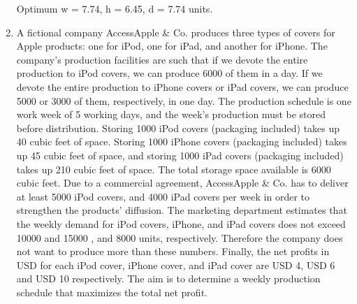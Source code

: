 \documentclass[journal,12pt,twocolumn]{IEEEtran}
\begin{document}
\begin{enumerate}
Optimum w = 7.74, h = 6.45, d = 7.74 units. 
\item A fictional company AccessApple  \&  Co. produces three types of covers for Apple products:
one for iPod, one for iPad, and another for iPhone. The company's production facilities are
such that if we devote the entire production to iPod covers, we can produce 6000 of them
in a day. If we devote the entire production to iPhone covers or iPad covers, we can
produce 5000 or 3000 of them, respectively, in one day.
The production schedule is one work week of 5 working days, and the week's production
must be stored before distribution. Storing 1000 iPod covers (packaging included) takes up
40 cubic feet of space. Storing 1000 iPhone covers (packaging included) takes up 45 cubic
feet of space, and storing 1000 iPad covers (packaging included) takes up 210 cubic feet of
space. The total storage space available is 6000 cubic feet.
Due to a commercial agreement, AccessApple \& Co. has to deliver at least 5000 iPod
covers, and 4000 iPad covers per week in order to strengthen the products’ diffusion.
The marketing department estimates that the weekly demand for iPod covers, iPhone, and
iPad covers does not exceed 10000 and 15000 , and 8000 units, respectively. Therefore the
company does not want to produce more than these numbers.
Finally, the net profits in USD for each iPod cover, iPhone cover, and iPad cover are USD 4,
USD 6 and USD 10 respectively.
The aim is to determine a weekly production schedule that maximizes the total net
profit. \\


\end{enumerate}
\end{document}
